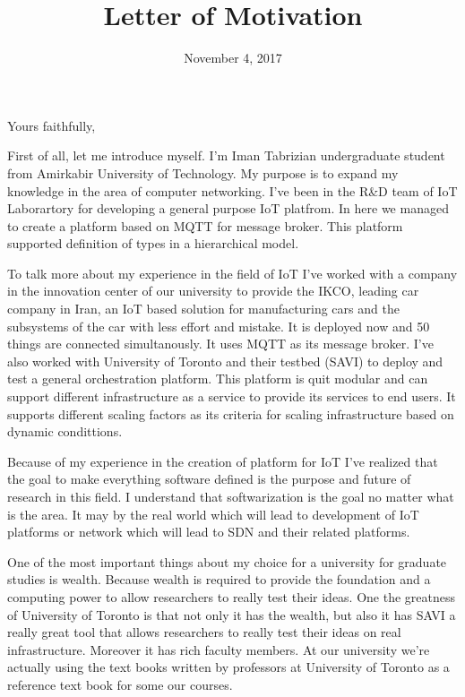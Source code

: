 \documentclass[11pt,a4paper,sans]{moderncv}        %
\title{Letter of Motivation}                               %
\begin{document}
\date{November 4, 2017}
\opening{}
\closing{Yours faithfully,}

\makelettertitle

First of all, let me introduce myself. I'm Iman Tabrizian undergraduate student
from Amirkabir University of Technology. My purpose is to expand my knowledge
in the area of computer networking. I've been in the R\&D team of IoT Laborartory
for developing a general purpose IoT platfrom. In here we managed to create
a platform based on MQTT for message broker. This platform supported definition
of types in a hierarchical model.

To talk more about my experience in the field of IoT I've worked with a
company in the innovation center of our university to provide the IKCO,
leading car company in Iran, an IoT based solution for manufacturing cars
and the subsystems of the car with less effort and mistake. It is deployed now
and 50 things are connected simultanously. It uses MQTT as its message broker.
I've also worked with University of Toronto and their testbed (SAVI) to deploy
and test a general orchestration platform. This platform is quit modular
and can support different infrastructure as a service to provide its services
to end users. It supports different scaling factors as its criteria for scaling
infrastructure based on dynamic condittions.

Because of my experience in the creation of platform for IoT I've realized that
the goal to make everything software defined is the purpose and future of
research in this field. I understand that softwarization is the
goal no matter what is the area. It may by the real world which will lead
to development of IoT platforms or network which will lead to SDN and their
related platforms.

One of the most important things about my choice for a university for graduate
studies is wealth. Because wealth is required to provide the foundation and
a computing power to allow researchers to really test their ideas. One the
greatness of University of Toronto is that not only it has the wealth, but also
it has SAVI a really great tool that allows researchers to really test their
ideas on real infrastructure. Moreover it has rich faculty members. At our
university we're actually using the text books written by professors at University
of Toronto as a reference text book for some our courses.
\end{document}
